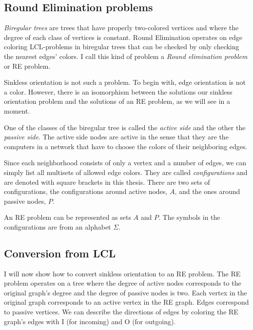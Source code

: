 \documentclass[english, 12pt, a4paper, sci, a-1b, online]{aaltothesis}
\begin{document}
\subsection{Round Elimination problems}

\emph{Biregular trees} are trees that have properly two-colored vertices and where the degree of each class of vertices is constant. Round Elimination operates on edge coloring LCL-problems in biregular trees that can be checked by only checking the nearest edges' colors. I call this kind of problem a \emph{Round elimination problem} or RE problem.

Sinkless orientation is not such a problem. To begin with, edge orientation is not a color. However, there is an isomorphism between the solutions our sinkless orientation problem and the solutions of an RE problem, as we will see in a moment.

One of the classes of the biregular tree is called the \emph{active side} and the other the \emph{passive side}. The active side nodes are active in the sense that they are the computers in a network that have to choose the colors of their neighboring edges.

Since each neighborhood consists of only a vertex and a number of edges, we can simply list all multisets of allowed edge colors. They are called \emph{configurations} and are denoted with square brackets in this thesis. There are two sets of configurations, the configurations around active nodes, $A$, and the ones around passive nodes, $P$.

An RE problem can be represented as sets $A$ and $P$. The symbols in the configurations are from an alphabet $\Sigma$.

\subsection{Conversion from LCL}

I will now show how to convert sinkless orientation to an RE problem. The RE problem operates on a tree where the degree of active nodes corresponds to the original graph's degree and the degree of passive nodes is two. Each vertex in the original graph corresponds to an active vertex in the RE graph. Edges correspond to passive vertices. We can describe the directions of edges by coloring the RE graph's edges with I (for incoming) and O (for outgoing).
\end{document}
